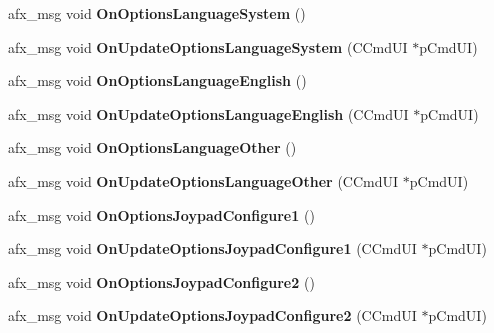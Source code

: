\begin{DoxyCompactItemize}
\item 
\mbox{\label{class_main_wnd_a9e8eaf3488f32697f695789cb89a7dce}} 
afx\+\_\+msg void {\bfseries On\+Options\+Language\+System} ()
\item 
\mbox{\label{class_main_wnd_a4f8798fc51757dbdff7f0b2bd7e93a82}} 
afx\+\_\+msg void {\bfseries On\+Update\+Options\+Language\+System} (C\+Cmd\+UI $\ast$p\+Cmd\+UI)
\item 
\mbox{\label{class_main_wnd_a611b1bde0b2a2ca47ace63d4dec8c27a}} 
afx\+\_\+msg void {\bfseries On\+Options\+Language\+English} ()
\item 
\mbox{\label{class_main_wnd_a4c2148b6e984eadb4bc8e16f43d720dc}} 
afx\+\_\+msg void {\bfseries On\+Update\+Options\+Language\+English} (C\+Cmd\+UI $\ast$p\+Cmd\+UI)
\item 
\mbox{\label{class_main_wnd_a49362710ce41db0c6afc8e8bf529ea4d}} 
afx\+\_\+msg void {\bfseries On\+Options\+Language\+Other} ()
\item 
\mbox{\label{class_main_wnd_a253ed6fa2a8e7f58b8ad1fce6b45f70e}} 
afx\+\_\+msg void {\bfseries On\+Update\+Options\+Language\+Other} (C\+Cmd\+UI $\ast$p\+Cmd\+UI)
\item 
\mbox{\label{class_main_wnd_af3ee3cb477d6492d5a548cf41ad1b16f}} 
afx\+\_\+msg void {\bfseries On\+Options\+Joypad\+Configure1} ()
\item 
\mbox{\label{class_main_wnd_a286f4a4cb4a6cfba840645853ab7132c}} 
afx\+\_\+msg void {\bfseries On\+Update\+Options\+Joypad\+Configure1} (C\+Cmd\+UI $\ast$p\+Cmd\+UI)
\item 
\mbox{\label{class_main_wnd_afb2b65a9fbb1b37c10b73c1752b94f4e}} 
afx\+\_\+msg void {\bfseries On\+Options\+Joypad\+Configure2} ()
\item 
\mbox{\label{class_main_wnd_aab2ac316b4151d3235065ddb6fae1c42}} 
afx\+\_\+msg void {\bfseries On\+Update\+Options\+Joypad\+Configure2} (C\+Cmd\+UI $\ast$p\+Cmd\+UI)
\item 

\end{DoxyCompactItemize}
